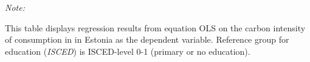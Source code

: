 \begin{table}[htbp!]
\begin{adjustbox}{width = 1\textwidth, max height = 0.95\textheight, center}
\begin{threeparttable}[b]
         \begin{tablenotes}\item \medskip \textit{Note:}
            \item This table displays regression results from equation OLS on the carbon intensity of consumption in  in Estonia as the dependent variable. Reference group for education (\textit{ISCED}) is ISCED-level 0-1 (primary or no education).
         \end{tablenotes}
      \end{threeparttable}
   \end{adjustbox}
\end{table}


